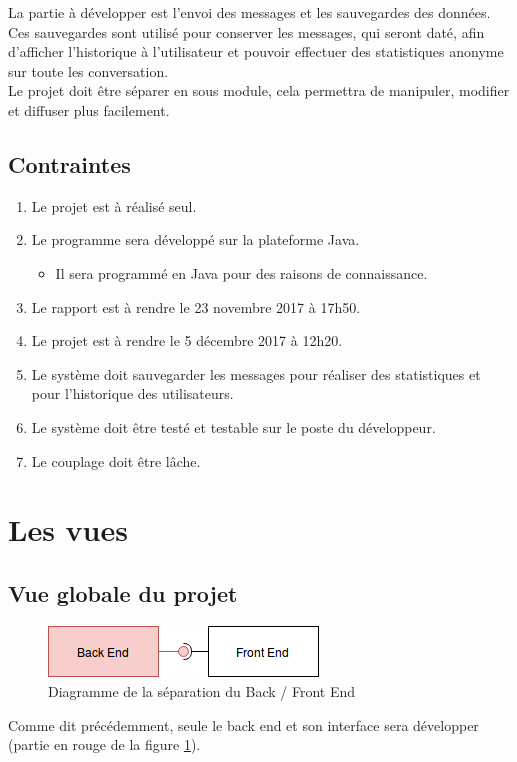 \documentclass[12pt]{article}
\begin{document}
La partie à développer est l'envoi des messages et les sauvegardes des données. Ces sauvegardes sont utilisé pour conserver les messages, qui seront daté, afin d'afficher l'historique à l'utilisateur et pouvoir effectuer des statistiques anonyme sur toute les conversation.
\\

Le projet doit être séparer en sous module, cela permettra de manipuler, modifier et diffuser plus facilement.


\subsection{Contraintes}
\begin{enumerate}
    \item Le projet est à réalisé seul.
    \item Le programme sera développé sur la plateforme Java.
    \begin{itemize}
        \item Il sera programmé en Java pour des raisons de connaissance.
    \end{itemize}
    \item Le rapport est à rendre le 23 novembre 2017 à 17h50.
    \item Le projet est à rendre le 5 décembre 2017 à 12h20.
    \item Le système doit sauvegarder les messages pour réaliser des statistiques et pour l'historique des utilisateurs.
    \item Le système doit être testé et testable sur le poste du développeur.
    \item Le couplage doit être lâche.
\end{enumerate}


\clearpage
\section{Les vues}
\subsection{Vue globale du projet}

\begin{figure}[h]
    \centering
    \includegraphics[]{img/Diagramme_sep_Back_Front.png}
    \caption{Diagramme de la séparation du Back / Front End}
    \label{fig:diag_back_front}
\end{figure}
Comme dit précédemment, seule le back end et son interface sera développer (partie en rouge de la figure \ref{fig:diag_back_front}).
\end{document}
